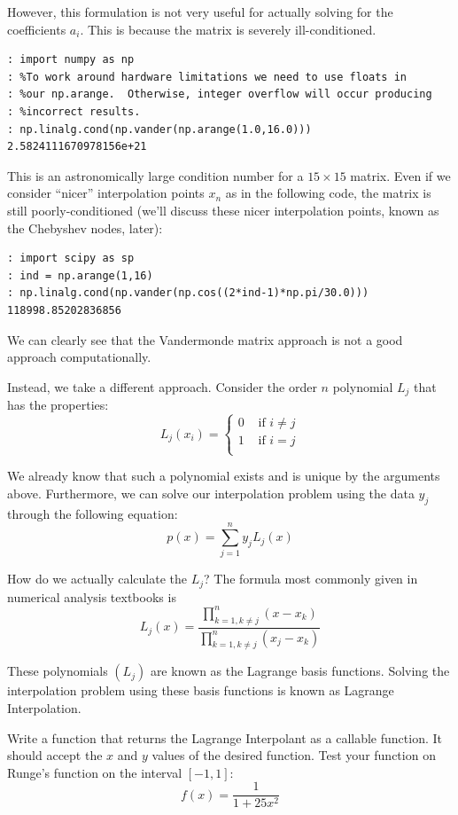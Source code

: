 However, this formulation is not very useful for actually solving for the coefficients $a_i$. This is because the matrix is severely ill-conditioned.

\begin{lstlisting}
: import numpy as np
: %To work around hardware limitations we need to use floats in
: %our np.arange.  Otherwise, integer overflow will occur producing
: %incorrect results.
: np.linalg.cond(np.vander(np.arange(1.0,16.0)))
2.5824111670978156e+21
\end{lstlisting}

This is an astronomically large condition number for a $15 \times 15$ matrix. Even if we consider ``nicer'' interpolation points $x_n$ as in the following code, the matrix is still poorly-conditioned (we'll discuss these nicer interpolation points, known as the Chebyshev nodes, later):

\begin{lstlisting}
: import scipy as sp
: ind = np.arange(1,16)
: np.linalg.cond(np.vander(np.cos((2*ind-1)*np.pi/30.0)))
118998.85202836856
\end{lstlisting}

We can clearly see that the Vandermonde matrix approach is not a good approach computationally.

Instead, we take a different approach. Consider the order $n$ polynomial $L_j$ that has the properties:
\[
L_j(x_i) = \begin{cases} 0 &\mbox{ if } i \neq j\\ 1 &\mbox{ if } i =j \\ \end{cases}
\]

We already know that such a polynomial exists and is unique by the arguments above. Furthermore, we can solve our interpolation problem using the data $y_j$ through the following equation:
\[
p(x) = \sum_{j=1}^n y_j L_j(x)
\]

How do we actually calculate the $L_j$? The formula most commonly given in numerical analysis textbooks is
\[
L_j(x) = \frac{\displaystyle\prod_{k=1, k \neq j}^n (x-x_k)}{\displaystyle\prod_{k=1, k \neq j}^n (x_j-x_k)}
\]

These polynomials $(L_j)$ are known as the Lagrange basis functions. Solving the interpolation problem using these basis functions is known as Lagrange Interpolation.

\begin{problem}
Write a function that returns the Lagrange Interpolant as a callable function. It should accept the $x$ and $y$ values of the desired function. Test your function on Runge's function on the interval $[-1,1]$:
\[
f(x) = \frac{1}{1+25x^2}
\]
\end{problem}

